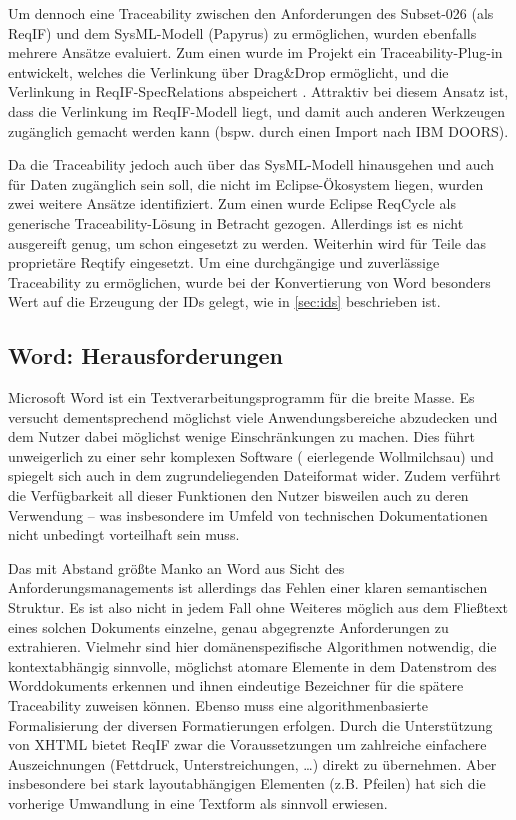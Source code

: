 \documentclass[twoside]{article}
\begin{document}
\begin{multicols}{2}
Um dennoch eine Traceability zwischen den Anforderungen des Subset-026 (als ReqIF) und dem SysML-Modell (Papyrus) zu ermöglichen, wurden ebenfalls mehrere Ansätze evaluiert.  Zum einen wurde im Projekt ein Traceability-Plug-in entwickelt, welches die Verlinkung über Drag\&Drop ermöglicht, und die Verlinkung in ReqIF-SpecRelations abspeichert \cite{rmf-traces}.  Attraktiv bei diesem Ansatz ist, dass die Verlinkung im ReqIF-Modell liegt, und damit auch anderen Werkzeugen zugänglich gemacht werden kann (bspw. durch einen Import nach IBM DOORS).

Da die Traceability jedoch auch über das SysML-Modell hinausgehen und auch für Daten zugänglich sein soll, die nicht im Eclipse-Ökosystem liegen, wurden zwei weitere Ansätze identifiziert.  Zum einen wurde Eclipse ReqCycle \cite{Todo} als generische Traceability-Lösung in Betracht gezogen.  Allerdings ist es nicht ausgereift genug, um schon eingesetzt zu werden.  Weiterhin wird für Teile das proprietäre Reqtify eingesetzt.  Um eine durchgängige und zuverlässige Traceability zu ermöglichen, wurde bei der Konvertierung von Word besonders Wert auf die Erzeugung der IDs gelegt, wie in \ref{sec:ids} beschrieben ist.

\subsection{Word: Herausforderungen}

Microsoft Word ist ein Textverarbeitungsprogramm für die breite Masse. Es versucht dementsprechend möglichst viele Anwendungsbereiche abzudecken und dem Nutzer dabei möglichst wenige Einschränkungen zu machen. Dies führt unweigerlich zu einer sehr komplexen Software (\glqq{} eierlegende Wollmilchsau\grqq{}) und spiegelt sich auch in dem zugrundeliegenden Dateiformat wider. Zudem verführt die Verfügbarkeit all dieser Funktionen den Nutzer bisweilen auch zu deren Verwendung -- was insbesondere im Umfeld von technischen Dokumentationen nicht unbedingt vorteilhaft sein muss.

Das mit Abstand größte Manko an Word aus Sicht des Anforderungsmanagements ist allerdings das Fehlen einer klaren semantischen Struktur. Es ist also nicht in jedem Fall ohne Weiteres möglich aus dem Fließtext eines solchen Dokuments einzelne, genau abgegrenzte Anforderungen zu extrahieren. Vielmehr sind hier domänenspezifische Algorithmen notwendig, die kontextabhängig sinnvolle, möglichst atomare Elemente in dem Datenstrom des Worddokuments erkennen und ihnen eindeutige Bezeichner für die spätere Traceability zuweisen können. Ebenso muss eine algorithmenbasierte Formalisierung der diversen Formatierungen erfolgen. Durch die Unterstützung von XHTML bietet ReqIF zwar die Voraussetzungen um zahlreiche einfachere Auszeichnungen (Fettdruck, Unterstreichungen, \ldots{}) direkt zu übernehmen. Aber insbesondere bei stark layoutabhängigen Elementen (z.B. Pfeilen) hat sich die vorherige Umwandlung in eine Textform als sinnvoll erwiesen.


\end{multicols}
\end{document}
